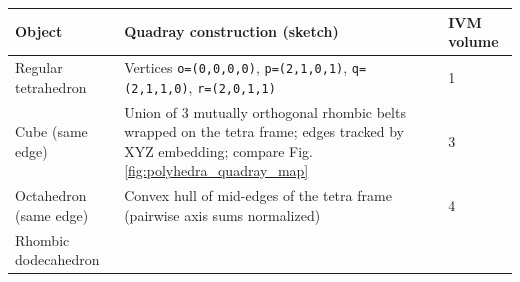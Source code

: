 \documentclass[
]{article}
\begin{document}
\begin{longtable}[]{@{}lll@{}}
\toprule
\begin{minipage}[b]{0.30\columnwidth}\raggedright
Object\strut
\end{minipage} & \begin{minipage}[b]{0.30\columnwidth}\raggedright
Quadray construction (sketch)\strut
\end{minipage} & \begin{minipage}[b]{0.30\columnwidth}\raggedright
IVM volume\strut
\end{minipage}\tabularnewline
\midrule
\endhead
\begin{minipage}[t]{0.30\columnwidth}\raggedright
Regular tetrahedron\strut
\end{minipage} & \begin{minipage}[t]{0.30\columnwidth}\raggedright
Vertices \texttt{o=(0,0,0,0)}, \texttt{p=(2,1,0,1)},
\texttt{q=(2,1,1,0)}, \texttt{r=(2,0,1,1)}\strut
\end{minipage} & \begin{minipage}[t]{0.30\columnwidth}\raggedright
1\strut
\end{minipage}\tabularnewline
\begin{minipage}[t]{0.30\columnwidth}\raggedright
Cube (same edge)\strut
\end{minipage} & \begin{minipage}[t]{0.30\columnwidth}\raggedright
Union of 3 mutually orthogonal rhombic belts wrapped on the tetra frame;
edges tracked by XYZ embedding; compare Fig.
\ref{fig:polyhedra_quadray_map}\strut
\end{minipage} & \begin{minipage}[t]{0.30\columnwidth}\raggedright
3\strut
\end{minipage}\tabularnewline
\begin{minipage}[t]{0.30\columnwidth}\raggedright
Octahedron (same edge)\strut
\end{minipage} & \begin{minipage}[t]{0.30\columnwidth}\raggedright
Convex hull of mid-edges of the tetra frame (pairwise axis sums
normalized)\strut
\end{minipage} & \begin{minipage}[t]{0.30\columnwidth}\raggedright
4\strut
\end{minipage}\tabularnewline
\begin{minipage}[t]{0.30\columnwidth}\raggedright
Rhombic dodecahedron\strut
\end{minipage} & \begin{minipage}[t]{0.30\columnwidth}\raggedright

\end{minipage}
\end{longtable}
\end{document}
